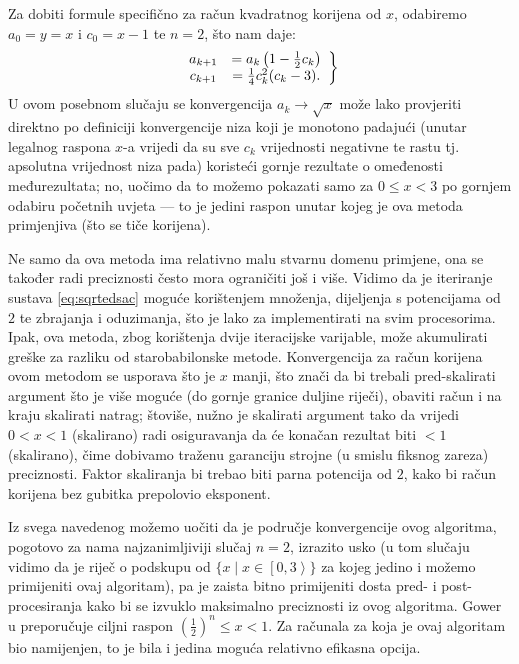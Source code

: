 \documentclass[12pt]{scrartcl}
\begin{document}
Za dobiti formule specifično za račun kvadratnog korijena od $x$, odabiremo $a_0=y=x$ i $c_0=x-1$ te $n=2$, što nam daje:
\begin{equation}
\left.
    \begin{array}{cc}
    \label{eq:sqrtedsac}
        a_{k+1} &= a_k\left(1-\frac12 c_k\right)\\
        c_{k+1} &= \frac14 c^2_k(c_k-3)\text.
\end{array}\right\}
\end{equation}
U ovom posebnom slučaju se konvergencija $a_k\to\sqrt x$ može lako provjeriti direktno po definiciji konvergencije
niza koji je monotono padajući (unutar legalnog raspona $x$-a vrijedi da su sve $c_k$ vrijednosti negativne te rastu tj.
apsolutna vrijednost niza pada) koristeći gornje rezultate o omeđenosti međurezultata; no, uočimo da to možemo pokazati
samo za $0\leq x<3$ po gornjem odabiru početnih uvjeta --- to je jedini raspon unutar kojeg je ova metoda primjenjiva (što se tiče korijena).

Ne samo da ova metoda ima relativno malu stvarnu domenu primjene, ona se također radi preciznosti često mora ograničiti još i više.
Vidimo da je iteriranje sustava \eqref{eq:sqrtedsac} moguće korištenjem množenja, dijeljenja s potencijama od $2$ te zbrajanja i oduzimanja, što
je lako za implementirati na svim procesorima. Ipak, ova metoda, zbog korištenja dvije iteracijske varijable, može akumulirati greške za razliku
od starobabilonske metode. Konvergencija za račun korijena ovom metodom se usporava što je $x$ manji, što znači da bi trebali pred-skalirati argument
što je više moguće (do gornje granice duljine riječi), obaviti račun i na kraju skalirati natrag; štoviše, nužno je
skalirati argument tako da vrijedi $0<x<1$ (skalirano) radi osiguravanja da će konačan rezultat biti $<1$ (skalirano), čime dobivamo
traženu garanciju strojne (u smislu fiksnog zareza) preciznosti. 
Faktor skaliranja bi trebao biti parna potencija od $2$,
kako bi račun korijena bez gubitka prepolovio eksponent.

Iz svega navedenog možemo uočiti da je područje konvergencije ovog algoritma, pogotovo za nama najzanimljiviji slučaj $n=2$, izrazito usko
(u tom slučaju vidimo da je riječ o podskupu od $\{x\mid x\in\left[0,3\right>\}$ za kojeg jedino i možemo primijeniti ovaj algoritam), pa je
zaista bitno primijeniti dosta pred- i post-procesiranja kako bi se izvuklo maksimalno preciznosti iz ovog algoritma.
Gower u \cite{gower} preporučuje ciljni raspon $(\frac12)^n\leq x<1$.
Za računala za koja je
ovaj algoritam bio
namijenjen, to je bila i jedina moguća relativno efikasna opcija.
\end{document}
